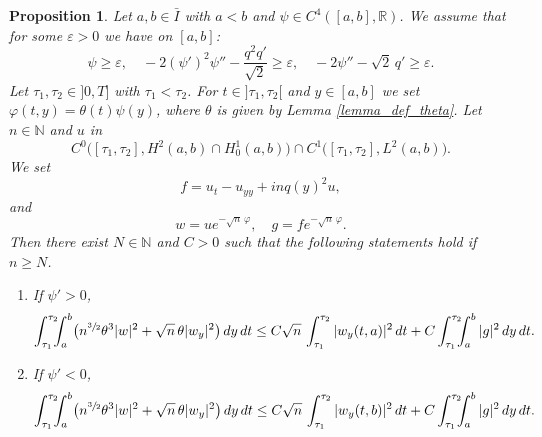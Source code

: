 \documentclass[JEP,XML,SOM,Unicode]{cedram}
\theoremstyle{plain}
\newtheorem{proposition}[theorem]{Proposition}
\theoremstyle{definition}
\newcommand{\abs}[1]{\vert #1\vert}
\newcommand{\1}{\mathds 1}
\newcommand{\R}{\mathbb{R}}
\newcommand{\N}{\mathbb{N}}
\let\e\varepsilon
\let\th\theta
\let\f\varphi
\begin{document}
\begin{proposition} \label{prop-carlemen-theta-psi}
Let $a,b \in \bar I$ with $a < b$ and $\psi \in C^4([a,b],\R)$. We assume that for some $\e > 0$ we have on $[a,b]$:
\[
\psi \geq \e, \quad - 2 (\psi')^2 \psi'' - \frac {q^2 q'}{\sqrt 2} \geq \e , \quad - 2 \psi'' - \sqrt 2\, q' \geq \e.
\]
Let $\tau_1,\tau_2 \in{}]0,T]$ with $\tau_1<\tau_2$. For $t \in{}]\tau_1,\tau_2[$ and $y \in [a,b]$ we set $\varphi(t,y) = \theta(t) \psi(y)$, where $\theta$ is given by Lemma \ref{lemma_def_theta}. Let $n \in \N$ and $u$ in
\begin{equation} \label{eq-C0-C1}
C^0\bigl([\tau_1,\tau_2],H^2(a,b) \cap H_0^1(a,b)\bigr) \cap C^1\bigl([\tau_1,\tau_2],L^2(a,b)\bigr).
\end{equation}
We set
\begin{equation} \label{eq-Kolmogorov-f}
f = u_t - u_{yy} + inq(y)^2 u,
\end{equation}
and
\begin{equation*}
w = u e^{-\sqrt n\,\f}, \quad g = f e^{-\sqrt n\,\f}.
\end{equation*}
Then there exist $N \in \N$ and $C>0$ such that the following statements hold if $n \geq N$.
\begin{enumerate}
\item If $\psi' > 0$,
\[
\int_{\tau_1}^{\tau_2}\hspace*{-2mm} \int_a^b \bigl(n^{\sfrac 32} \th^3 \abs w^2 + \sqrt n\,\th \abs{w_y}^2 \bigr) \, dy \, dt
\leq C \sqrt n\,\int_{\tau_1}^{\tau_2} \abs{w_y(t,a)}^2 \, dt + C \int_{\tau_1}^{\tau_2}\hspace*{-2mm} \int_a^b \abs g^2 \, dy \, dt.
\]
\item If $\psi' < 0$,
\[
\int_{\tau_1}^{\tau_2}\hspace*{-2mm} \int_a^b \bigl(n^{\sfrac 32} \th^3 \abs w^2 + \sqrt n\,\th \abs{w_y}^2 \bigr) \, dy \, dt
\leq C \sqrt n\,\int_{\tau_1}^{\tau_2} \abs{w_y(t,b)}^2 \, dt + C \int_{\tau_1}^{\tau_2}\hspace*{-2mm} \int_a^b \abs g^2 \, dy \, dt.
\]
\end{enumerate}
\end{proposition}
\end{document}
